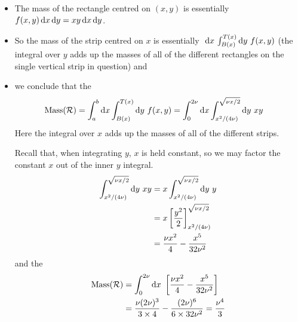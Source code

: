 \begin{eg}[Mass]
\begin{itemize}
\item
  The mass of the rectangle centred on $(x,y)$
        is essentially $f(x,y)\,\mathrm{d}x\,\mathrm{d}y=xy\,\mathrm{d}x\,\mathrm{d}y$.
\item 
   So the mass of the strip centred on $x$ is 
         essentially $\ \mathrm{d}x\, \int_{B(x)}^{T(x)}\mathrm{d}y\ f(x,y) $ 
   (the integral over $y$ adds up the masses of all of the different rectangles     on the single vertical strip in question) and  
\item
   we conclude that the
\begin{align*}
    \text{Mass}(\mathcal{R})
        &=\int_a^b \mathrm{d}x\int_{B(x)}^{T(x)} \mathrm{d}y\ f(x,y) 
         =\int_0^{2\nu} \mathrm{d}x\int_{x^2/(4\nu)}^{\sqrt{\nu x/2}} \mathrm{d}y\ xy 
\end{align*}
Here the integral over $x$ adds up the masses of all of the different strips.

Recall that, when integrating $y$, $x$ is held constant, so we may factor the
constant $x$ out of the inner $y$ integral.
\begin{align*}
\int_{x^2/(4\nu)}^{\sqrt{\nu x/2}} \mathrm{d}y\ xy
&= x\int_{x^2/(4\nu)}^{\sqrt{\nu x/2}} \mathrm{d}y\ y \\
&= x\left[\frac{y^2}{2}\right]_{x^2/(4\nu)}^{\sqrt{\nu x/2}} \\
&=\frac{\nu x^2}{4}-\frac{x^5}{32\nu^2}
\end{align*}
and the 
\begin{align*}
\text{Mass}(\cR)
        &=\int_0^{2\nu} \dee{x}\ 
             \left[\frac{\nu x^2}{4}-\frac{x^5}{32\nu^2}\right] \\
        &= \frac{\nu (2\nu)^3}{3\times 4}-\frac{(2\nu)^6}{6\times 32\nu^2}
         =\frac{\nu^4}{3}
\end{align*}
\end{itemize}



\end{eg}
